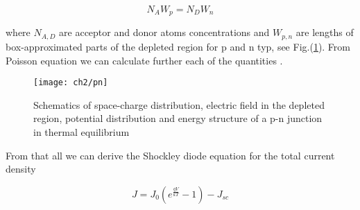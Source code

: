 \begin{equation}
N_AW_p=N_DW_n
\end{equation}

where $N_{A,D}$ are acceptor and donor atoms concentrations and $W_{p,n}$ are lengths of box-approximated parts of the depleted region for p and n typ, see Fig.(\ref{fig:pn}). From Poisson equation we can calculate further each of the quantities \cite{sze}.

\begin{figure}
\centering
\texttt{[image: ch2/pn]}
\caption{Schematics of space-charge distribution, electric field in the depleted region, potential distribution and energy structure of a p-n junction in thermal equilibrium}
\label{fig:pn}
\end{figure}

From that all we can derive the Shockley diode equation for the total current density\cite{pv}

\begin{equation}
J = J_0(e^{\frac{qV}{kT}}-1) - J_{sc}
\label{eq:Shockley}
\end{equation}

